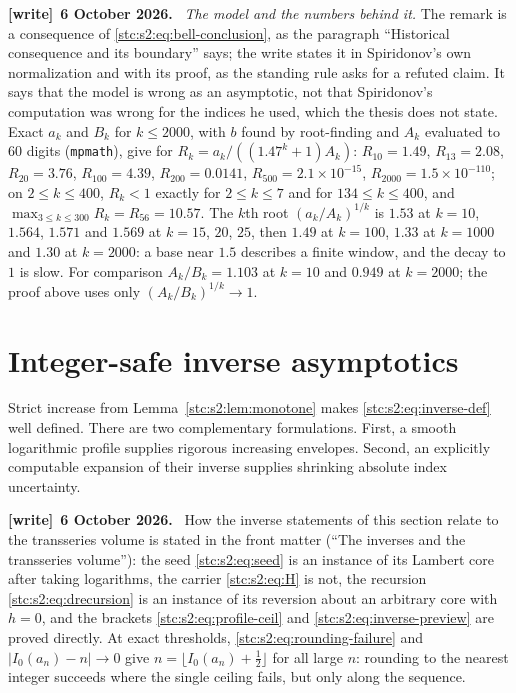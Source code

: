 \documentclass[11pt,letterpaper]{article}
\numberwithin{equation}{section}
\theoremstyle{remark}\newtheorem{remark}[theorem]{Remark}
\newenvironment{writenote}[1][]{\par\smallskip\begingroup\small
 \noindent\textbf{[write]}\if\relax\detokenize{#1}\relax\else~\textbf{#1.}\fi\ }%
 {\par\endgroup\smallskip}
\begin{document}
\begin{writenote}[6 October 2026]
\emph{The model and the numbers behind it.} The remark is a consequence of \eqref{stc:s2:eq:bell-conclusion}, as the paragraph ``Historical consequence and its boundary'' says; the write states it in Spiridonov's own normalization and with its proof, as the standing rule asks for a refuted claim. It says that the model is wrong as an asymptotic, not that Spiridonov's computation was wrong for the indices he used, which the thesis does not state. Exact $a_k$ and $B_k$ for $k\le2000$, with $b$ found by root-finding and $A_k$ evaluated to 60 digits (\texttt{mpmath}), give for $R_k=a_k/((1.47^k+1)A_k)$: $R_{10}=1.49$, $R_{13}=2.08$, $R_{20}=3.76$, $R_{100}=4.39$, $R_{200}=0.0141$, $R_{500}=2.1\times10^{-15}$, $R_{2000}=1.5\times10^{-110}$; on $2\le k\le400$, $R_k<1$ exactly for $2\le k\le7$ and for $134\le k\le400$, and $\max_{3\le k\le300}R_k=R_{56}=10.57$. The $k$th root $(a_k/A_k)^{1/k}$ is $1.53$ at $k=10$, $1.564$, $1.571$ and $1.569$ at $k=15$, $20$, $25$, then $1.49$ at $k=100$, $1.33$ at $k=1000$ and $1.30$ at $k=2000$: a base near $1.5$ describes a finite window, and the decay to $1$ is slow. For comparison $A_k/B_k=1.103$ at $k=10$ and $0.949$ at $k=2000$; the proof above uses only $(A_k/B_k)^{1/k}\to1$.
\end{writenote}

\section{Integer-safe inverse asymptotics}\label{stc:s2:sec:inverse}
Strict increase from Lemma~\ref{stc:s2:lem:monotone} makes \eqref{stc:s2:eq:inverse-def} well defined. There are two complementary formulations. First, a smooth logarithmic profile supplies rigorous increasing envelopes. Second, an explicitly computable expansion of their inverse supplies shrinking absolute index uncertainty.

\begin{writenote}[6 October 2026]
How the inverse statements of this section relate to the transseries volume \cite{TSvol} is stated in the front matter (``The inverses and the transseries volume''): the seed \eqref{stc:s2:eq:seed} is an instance of its Lambert core after taking logarithms, the carrier \eqref{stc:s2:eq:H} is not, the recursion \eqref{stc:s2:eq:drecursion} is an instance of its reversion about an arbitrary core with $h=0$, and the brackets \eqref{stc:s2:eq:profile-ceil} and \eqref{stc:s2:eq:inverse-preview} are proved directly. At exact thresholds, \eqref{stc:s2:eq:rounding-failure} and $|I_0(a_n)-n|\to0$ give $n=\lfloor I_0(a_n)+\frac12\rfloor$ for all large $n$: rounding to the nearest integer succeeds where the single ceiling fails, but only along the sequence.
\end{writenote}
\end{document}
